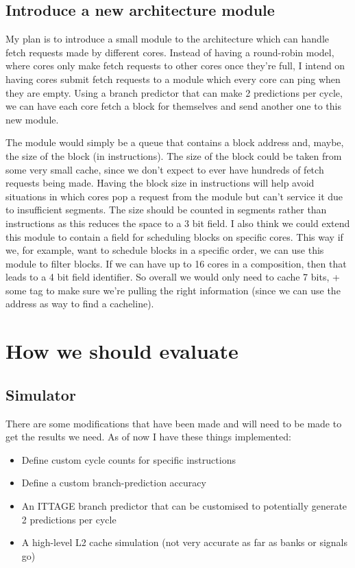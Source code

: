 \subsection{Introduce a new architecture module}

My plan is to introduce a small module to the architecture which can handle fetch requests made by different cores.
Instead of having a round-robin model, where cores only make fetch requests to other cores once they're full, I intend on having cores submit fetch requests to a module which every core can ping when they are empty.
Using a branch predictor that can make 2 predictions per cycle, we can have each core fetch a block for themselves and send another one to this new module.

The module would simply be a queue that contains a block address and, maybe, the size of the block (in instructions).
The size of the block could be taken from some very small cache, since we don't expect to ever have hundreds of fetch requests being made.
Having the block size in instructions will help avoid situations in which cores pop a request from the module but can't service it due to insufficient segments.
The size should be counted in segments rather than instructions as this reduces the space to a 3 bit field.
I also think we could extend this module to contain a field for scheduling blocks on specific cores.
This way if we, for example, want to schedule blocks in a specific order, we can use this module to filter blocks.
If we can have up to 16 cores in a composition, then that leads to a 4 bit field identifier.
So overall we would only need to cache 7 bits, + some tag to make sure we're pulling the right information (since we can use the address as way to find a cacheline).

\section{How we should evaluate}

\subsection{Simulator}

There are some modifications that have been made and will need to be made to get the results we need.
As of now I have these things implemented:

\begin{itemize}
\item Define custom cycle counts for specific instructions
\item Define a custom branch-prediction accuracy
\item An ITTAGE branch predictor that can be customised to potentially generate 2 predictions per cycle
\item A high-level L2 cache simulation (not very accurate as far as banks or signals go)
\end{itemize}

